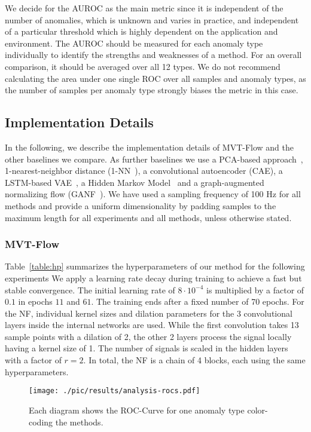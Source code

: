 \documentclass[journal]{IEEEtran}
\begin{document}
We decide for the AUROC as the main metric since it is independent of the number of anomalies, which is unknown and varies in practice, and independent of a particular threshold which is highly dependent on the application and environment.
The AUROC should be measured for each anomaly type individually to identify the strengths and weaknesses of a method.
For an overall comparison, it should be averaged over all 12 types.
We do not recommend calculating the area under one single ROC over all samples and anomaly types, as the number of samples per anomaly type strongly biases the metric in this case.


\subsection{Implementation Details}
\label{imp_details}


{In the following, we describe the implementation details of MVT-Flow and the other baselines we compare. As further baselines we use a PCA-based approach~\cite{hornung2014model}, 1-nearest-neighbor distance (1-NN~\cite{amer2012nearest}), a convolutional autoencoder (CAE), a LSTM-based VAE~\cite{park2018multimodal}, a Hidden Markov Model~\cite{hmm_ad} and a graph-augmented normalizing flow (GANF~\cite{GANF}).
We have used a sampling frequency of 100 Hz for all methods and provide a uniform dimensionality by padding samples to the maximum length for all experiments and all methods, unless otherwise stated.}
\subsubsection{MVT-Flow}
Table~\ref{table:hp} summarizes the hyperparameters of our method for the following experiments
We apply a learning rate decay during training to achieve a fast but stable convergence. The initial learning rate of $8\cdot 10^{-4}$ is multiplied by a factor of $0.1$ in epochs $11$ and $61$.
The training ends after a fixed number of 70 epochs.
For the NF, individual kernel sizes and dilation parameters for the 3 convolutional layers inside the internal networks are used.
While the first convolution takes 13 sample points with a dilation of 2, the other 2 layers process the signal locally having a kernel size of 1.
The number of signals is scaled in the hidden layers with a factor of $r=2$.
In total, the NF is a chain of 4 blocks, each using the same hyperparameters.

\begin{figure*}

    \centering
    \texttt{[image: ./pic/results/analysis-rocs.pdf]}
    \caption{Each diagram shows the ROC-Curve for one anomaly type color-coding the methods.
    }
    \label{fig:analysis_rocs}
    \vspace{-3mm}
    
\end{figure*}
\end{document}
